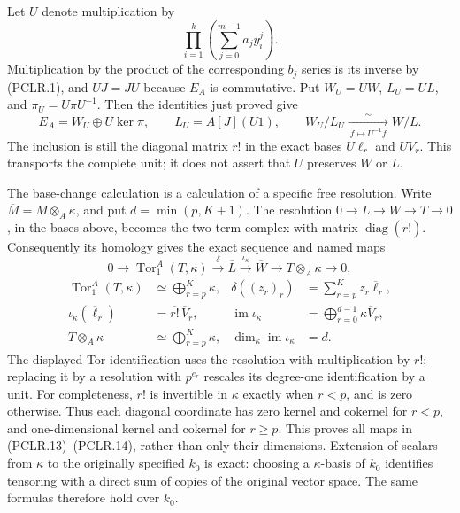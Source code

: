 Let \(U\) denote multiplication by
\[
 \prod_{i=1}^k\left(\sum_{j=0}^{m-1}a_jy_i^j\right).
 \tag{PCLR.11}
\]
Multiplication by the product of the corresponding \(b_j\) series
is its inverse by (PCLR.1), and \(UJ=JU\) because \(E_A\) is
commutative. Put \(W_U=UW\), \(L_U=UL\), and
\(\pi_U=U\pi U^{-1}\). Then the identities just proved give
\[
 E_A=W_U\oplus U\ker\pi,\qquad
 L_U=A[J](U1),\qquad
 W_U/L_U\xrightarrow[\ f\mapsto U^{-1}f\ ]{\sim}W/L.
 \tag{PCLR.12}
\]
The inclusion is still the diagonal matrix \(r!\) in the exact
bases \(U\ell_r\) and \(UV_r\). This transports the complete unit;
it does not assert that \(U\) preserves \(W\) or \(L\).

The base-change calculation is a calculation of a specific free
resolution. Write \(\overline M=M\otimes_A\kappa\), and put
\(d=\min(p,K+1)\). The resolution
\(0\to L\to W\to T\to0\), in the bases above, becomes the two-term
complex with matrix \(\operatorname{diag}(\overline{r!})\).
Consequently its homology gives the exact sequence and named maps
\[
 0\longrightarrow\operatorname{Tor}_1^A(T,\kappa)
 \xrightarrow{\delta}\overline L
 \xrightarrow{\iota_\kappa}\overline W
 \longrightarrow T\otimes_A\kappa\longrightarrow0,
 \tag{PCLR.13}
\]
\[
 \begin{aligned}
 \operatorname{Tor}_1^A(T,\kappa)
    &\simeq\bigoplus_{r=p}^K\kappa,
 &\delta((z_r)_r)&=\sum_{r=p}^Kz_r\overline\ell_r,\\
 \iota_\kappa(\overline\ell_r)&=
                  \overline{r!}\,\overline V_r,
 &\operatorname{im}\iota_\kappa&=
                  \bigoplus_{r=0}^{d-1}\kappa\overline V_r,\\
 T\otimes_A\kappa&\simeq\bigoplus_{r=p}^K\kappa,
 &\dim_\kappa\operatorname{im}\iota_\kappa&=d.
 \end{aligned}
 \tag{PCLR.14}
\]
The displayed Tor identification uses the resolution with
multiplication by \(r!\); replacing it by a resolution with
\(p^{e_r}\) rescales its degree-one identification by a unit.
For completeness, \(r!\) is invertible in \(\kappa\) exactly when
\(r<p\), and is zero otherwise. Thus each diagonal coordinate
has zero kernel and cokernel for \(r<p\), and one-dimensional
kernel and cokernel for \(r\geq p\). This proves all maps in
(PCLR.13)--(PCLR.14), rather than only their dimensions. Extension
of scalars from \(\kappa\) to the originally specified \(k_0\)
is exact: choosing a \(\kappa\)-basis of \(k_0\) identifies
tensoring with a direct sum of copies of the original vector
space. The same formulas therefore hold over \(k_0\).

